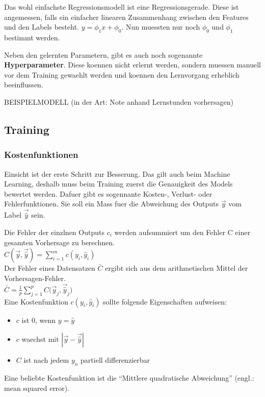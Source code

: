 \documentclass[../main]{subfiles}
\begin{document}
Das wohl einfachste Regressionsmodell ist eine Regressionsgerade. Diese ist angemessen, falls ein einfacher linearen Zusammenhang zwischen den Features und den Labels besteht.
$y=\phi_1x + \phi_0$. Nun muessten nur noch $\phi_0$ und $\phi_1$ bestimmt werden. 

Neben den gelernten Parametern, gibt es auch noch sogenannte \textbf{Hyperparameter}.
Diese koennen nicht erlernt werden, sondern muessen manuell vor dem Training gewaehlt werden und koennen den Lernvorgang erheblich beeinflussen.

BEISPIELMODELL (in der Art: Note anhand Lernstunden vorhersagen)

\subsection{Training}
\subsubsection{Kostenfunktionen}
Einsicht ist der erste Schritt zur Besserung. Das gilt auch beim Machine Learning, deshalb muss beim Training zuerst die Genauigkeit des Models bewertet werden.
Dafuer gibt es sogennante Kosten-, Verlust- oder Fehlerfunktionen. Sie soll ein Mass fuer die Abweichung des Outputs $\vec{y}$ vom Label $\vec{\hat{y}}$ sein.\par

Die Fehler der einzlnen Outputs $c_i$ werden aufsummiert um den Fehler C einer gesamten Vorhersage zu berechnen.\\
$C(\vec{y},\vec{\hat{y}})=\displaystyle\sum_{i=1}^{m} c(y_i, \hat{y}_i)$\\
Der Fehler eines Datensatzen $\bar{C}$ ergibt sich aus dem arithmetischen Mittel der Vorhersagen-Fehler.\\
$\bar{C} = \frac{1}{p}\displaystyle\sum_{j=1}^{p} C\Big(\vec{y}_j,\vec{\hat{y}}_j\Big)$\\
%
Eine Kostenfunktion $c(y_i,\hat{y}_i)$ sollte folgende Eigenschaften aufweisen:
\begin{itemize}
    \item{$c$ ist $0$, wenn $y = \hat{y}$}
    \item{$c$ waechst mit $|\vec{y}-\vec{\hat{y}}|$}
    \item{$C$ ist nach jedem $y_n$ partiell differenzierbar}
\end{itemize}

Eine beliebte Kostenfunktion ist die ``Mittlere quadratische Abweichung'' (engl.: mean squared error).
\end{document}
